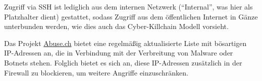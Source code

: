 Zugriff via \ac{SSH} ist lediglich aus dem internen Netzwerk (\enquote{Internal}, was hier als Platzhalter dient) gestattet, sodass Zugriff aus dem öffentlichen Internet in Gänze unterbunden werden, wie dies auch das Cyber-Killchain Modell vorsieht.

Das Projekt \href{https://abuse.ch}{Abuse.ch} bietet eine regelmäßig aktualisierte Liste mit bösartigen IP-Adressen an, die in Verbindung mit der Verbreitung von Malware oder Botnets stehen. Folglich bietet es sich an, diese IP-Adressen zusätzlich in der Firewall zu blockieren, um weitere Angriffe einzuschränken.